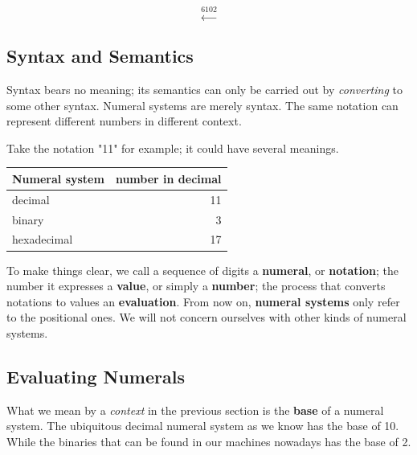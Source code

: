 \documentclass[../thesis.tex]{subfiles}
\begin{document}
$$ \xleftarrow{6102} $$

\subsection{Syntax and Semantics}

Syntax bears no meaning;
its semantics can only be carried out by \textit{converting} to some other syntax. 
Numeral systems are merely syntax.
The same notation can represent different numbers in different context.

Take the notation "11" for example; it could have several meanings.

\begin{center}
    \begin{tabular}{ | l | r | }
    \textbf{Numeral system}      & \textbf{number in decimal}  \\
    \hline
    decimal             & 11    \\
    binary              & 3     \\
    hexadecimal         & 17    \\
    \end{tabular}
\end{center}

To make things clear, we call a sequence of digits a \textbf{numeral}, or \textbf{notation};
the number it expresses a \textbf{value}, or simply a \textbf{number};
the process that converts notations to values an \textbf{evaluation}.
From now on, \textbf{numeral systems} only refer to the positional ones.
We will not concern ourselves with other kinds of numeral systems.

\subsection{Evaluating Numerals}

What we mean by a \textit{context} in the previous section is the \textbf{base} of
a numeral system.
The ubiquitous decimal numeral system as we know has the base of 10.
While the binaries that can be found in our machines nowadays has the base of 2.
\end{document}
